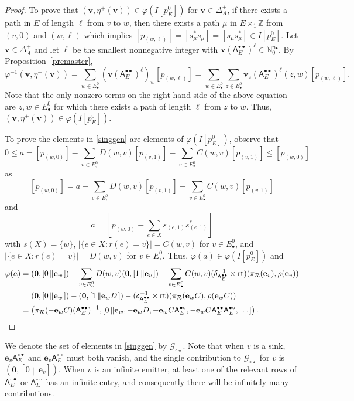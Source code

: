 \documentclass[12pt]{amsbook}%
\newcommand{\rt}{\operatorname{rt}}
\newcommand{\ee}{{\mathbf e}}
\renewcommand{\phi}{\varphi}
\theoremstyle{defin}
\theoremstyle{remark}
\numberwithin{equation}{chapter}
\numberwithin{theor}{section}
\newcommand{\NN}{\mathbb{N}}
\newcommand{\ZZ}{\mathbb{Z}}
\newcommand{\singgen}{\mathcal G_{\circ\star}}
\newcommand{\oXe}[2]{\left[#1\left\|{#2}\right.\right]}
\newcommand{\regX}{{\bullet}}
\newcommand{\singX}{{\circ}}
\newcommand{\vv}{\mathbf{v}}
\newcommand{\oo}{{\mathbf 0}}
\newcommand{\nor}{{n_\regX}}
\newcommand{\pK}[1]{\pi_{\mathcal R}(#1)}
\newcommand{\adjRR}{\mathsf{A}^{\bullet\bullet}}
\newcommand{\adjRS}{\mathsf{A}^{\bullet\circ}}
\newcommand{\adjSR}{\mathsf{A}^{\circ\bullet }}
\newcommand{\adjSS}{\mathsf{A}^{\circ\circ}}
\begin{document}
\begin{proof}
To prove that $\left(\vv,\eta^+(\vv)\right) \in \phi(I[p_E^0])$ for $\vv\in \Delta_{A}^+$, if there exists a path in $E$ of length $\ell$ from $v$ to $w$, then there exists a path $\mu$ in $E \times_1 \ZZ$ from $(v,0)$ and $(w, \ell)$ which implies $[ p_{(w,\ell)}  ] = [s_\mu^* s_\mu]  = [s_\mu s_\mu^*] \in   I[p_E^0]$.   Let $\vv \in \Delta_A^+$ and let $\ell$ be the smallest nonnegative integer with $\vv (\adjRR_E)^\ell \in \NN_0^\nor$.  By Proposition~\ref{premaster}, 
\[ \phi^{-1} ( \vv , \eta^+(\vv)) = \sum_{w \in E^0_\regX} (\vv (\adjRR_E)^\ell)_w [ p_{(w, \ell)} ] = \sum_{w \in E_\regX^0} \sum_{z \in E_\regX^0} \vv_z (\adjRR_E)^\ell (z,w) [ p_{(w, \ell)} ] .\]
Note that the only nonzero terms on the right-hand side of the above equation are $z , w \in E_\regX^0$ for which there exists a path of length $\ell$ from $z$ to $w$.  Thus, $( \vv , \eta^+(\vv)) \in \phi(I[p_E^0])$.

To prove the elements in \eqref{singgen} are elements of $\phi(I[p_E^0])$, observe that 
$$
0\leq a=[p_{ (w,0) }] - \sum_{ v \in E^0_\singX }D(w, v) [ p_{(v,1)}] - \sum_{ v \in E^0_\regX } C(w, v) [ p_{(v,1)}]
 \leq [p_{ (w, 0) }]$$
 as 
 $$
 [p_{(w,0)}] = a +  \sum_{ v \in E^0_\singX } D(w, v) [ p_{(v,1)}] + \sum_{ v \in E^0_\regX } C(w, v) [ p_{(v,1)}] 
 $$
 and 
 \[
 a = \left[ p_{(w,0)} - \sum_{e \in X } s_{ (e,1)} s_{(e,1)}^* \right]
 \]
 with $s(X) = \{w\}$, $| \{ e \in X :  r(e) =v \} | = C(w, v)$ for $v \in E^0_\regX$, and $| \{ e \in X :  r(e) =v \} | = D(w, v)$ for $v \in E^0_\singX$.  Thus, $\phi(a) \in \phi(I[p_E^0])$ and 
 \begin{align*}
 \phi(a) &= ( \oo, \oXe{0}{\ee_w} ) - \sum_{ v \in E^0_\singX } D(w, v) ( \oo, \oXe{1}{\ee_v})  - \sum_{v \in E^0_\regX} C(w, v)  (\delta_{\adjRR_E}^{-1} \times \rt) ( \pK{\ee_v} , \rho(\ee_v) )\\
 &= ( \oo, \oXe{0}{\ee_w} ) - ( \oo, \oXe{1}{\ee_w D} ) - (\delta_{\adjRR_E}^{-1} \times \rt)  ( \pK{\ee_w C } , \rho( \ee_w C))\\
		&=  \left(\pK{-\ee_w C} (\adjRR_E)^{-1},\oXe{0}{\ee_w,-\ee_w D, - \mathbf{e}_w C \adjRS_E,  - \mathbf{e}_w C \adjRR_E  \adjRS_E,\dots} \right).\qedhere
 \end{align*}
\end{proof}


We denote the set of elements in \eqref{singgen} by $\singgen$.\index{Gc@$\singgen$}
Note that when $v$ is a sink, $\ee_v \adjSR_E$ and $\ee_v \adjSS_E$ must both vanish, and the single contribution to $\singgen$ for $v$ is  $(\oo,\oXe{0}{\ee_v})$. When $v$ is an infinite emitter, at least one of the relevant rows of $\adjSR_E$ or $\adjSS_E$ has an infinite entry, and consequently there will be infinitely many contributions.
\end{document}
